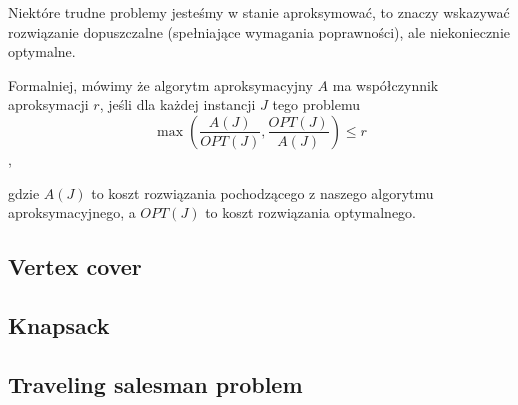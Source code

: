 Niektóre trudne problemy jesteśmy w stanie aproksymować, to znaczy wskazywać rozwiązanie dopuszczalne (spełniające wymagania poprawności), ale niekoniecznie optymalne.

Formalniej, mówimy że algorytm aproksymacyjny $A$ ma współczynnik aproksymacji $r$, jeśli dla każdej instancji $J$ tego problemu
\[
	\max\left(\frac{A(J)}{OPT(J)}, \frac{OPT(J)}{A(J)}\right) \leqslant r
\],

gdzie $A(J)$ to koszt rozwiązania pochodzącego z naszego algorytmu aproksymacyjnego, a $OPT(J)$ to koszt rozwiązania optymalnego.

\subsection{Vertex cover}


\subsection{Knapsack}


\subsection{Traveling salesman problem}
